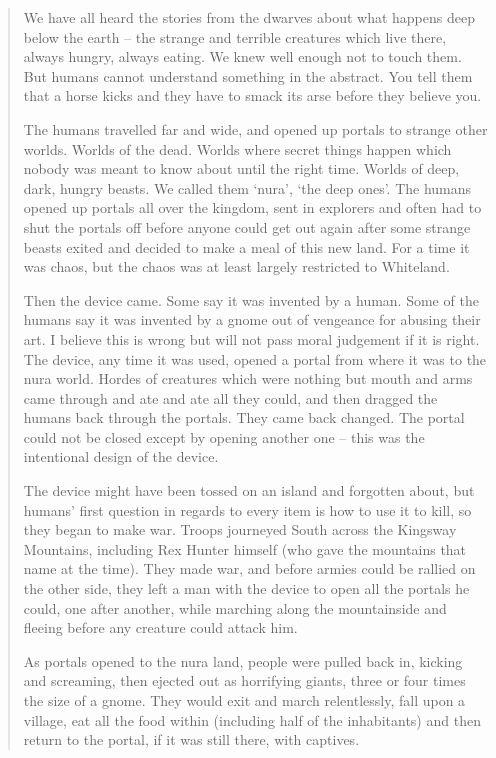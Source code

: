 \begin{multicols}{2}
\begin{quotation}
	We have all heard the stories from the dwarves about what happens deep below the earth -- the strange and terrible creatures which live there, always hungry, always eating.
	We knew well enough not to touch them.
	But humans cannot understand something in the abstract.
	You tell them that a horse kicks and they have to smack its arse before they believe you.

	The humans travelled far and wide, and opened up portals to strange other worlds.
	Worlds of the dead.
	Worlds where secret things happen which nobody was meant to know about until the right time.
	Worlds of deep, dark, hungry beasts.
	We called them `nura', `the deep ones'.
	The humans opened up portals all over the kingdom, sent in explorers and often had to shut the portals off before anyone could get out again after some strange beasts exited and decided to make a meal of this new land.
	For a time it was chaos, but the chaos was at least largely restricted to Whiteland.

	Then the device came.
	Some say it was invented by a human.
	Some of the humans say it was invented by a gnome out of vengeance for abusing their art.
	I believe this is wrong but will not pass moral judgement if it is right.
	The device, any time it was used, opened a portal from where it was to the nura world.
	Hordes of creatures which were nothing but mouth and arms came through and ate and ate all they could, and then dragged the humans back through the portals.
	They came back changed.
	The portal could not be closed except by opening another one -- this was the intentional design of the device.

	The device might have been tossed on an island and forgotten about, but humans' first question in regards to every item is how to use it to kill, so they began to make war.
	Troops journeyed South across the Kingsway Mountains, including Rex Hunter himself (who gave the mountains that name at the time).
	They made war, and before armies could be rallied on the other side, they left a man with the device to open all the portals he could, one after another, while marching along the mountainside and fleeing before any creature could attack him.

	As portals opened to the nura land, people were pulled back in, kicking and screaming, then ejected out as horrifying giants, three or four times the size of a gnome.
	They would exit and march relentlessly, fall upon a village, eat all the food within (including half of the inhabitants) and then return to the portal, if it was still there, with captives.


\end{quotation}
\end{multicols}
